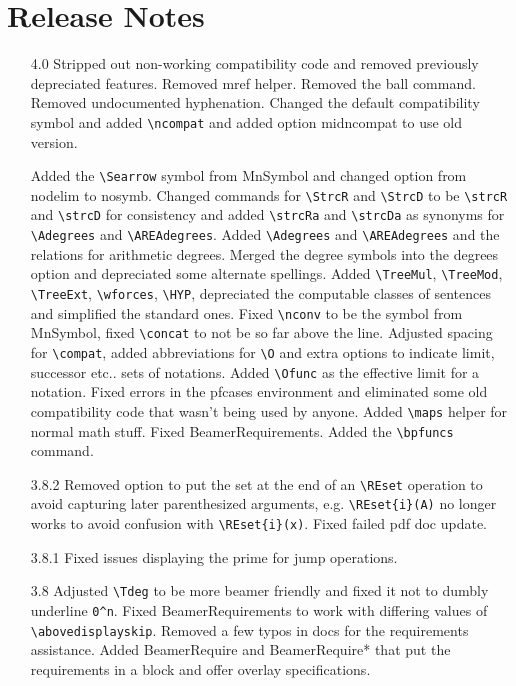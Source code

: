 \documentclass[leqno,11pt]{amsart}
\begin{document}
\section{Release Notes}


\begin{itemize}
	\item[4.0] Stripped out non-working compatibility code and removed previously depreciated features.  Removed mref helper.  Removed the ball command.  Removed undocumented hyphenation.   Changed the default compatibility symbol and added \verb=\ncompat= and added option midncompat to use old version.  

	Added the \verb=\Searrow= symbol from MnSymbol and changed option from nodelim to nosymb.
	Changed commands for \verb=\StrcR= and \verb=\StrcD= to be \verb=\strcR= and \verb=\strcD= for consistency and added \verb=\strcRa= and \verb=\strcDa= as synonyms for \verb=\Adegrees= and \verb=\AREAdegrees=.  Added \verb=\Adegrees= and \verb=\AREAdegrees= and the relations for arithmetic degrees.  Merged the degree symbols into the degrees option and depreciated some alternate spellings.  Added \verb=\TreeMul=, \verb=\TreeMod=, \verb=\TreeExt=, \verb=\wforces=, \verb=\HYP=, depreciated the computable classes of sentences and simplified the standard ones.  Fixed \verb=\nconv= to be the symbol from MnSymbol, fixed \verb=\concat= to not be so far above the line.  Adjusted spacing for \verb=\compat=, added abbreviations for \verb=\O= and extra options to indicate limit, successor etc.. sets of notations.  Added \verb=\Ofunc= as the effective limit for a notation.  Fixed errors in the pfcases environment and eliminated some old compatibility code that wasn't being used by anyone.  Added \verb=\maps= helper for normal math stuff.  Fixed BeamerRequirements.  Added the \verb=\bpfuncs= command.
	\item[3.8.2] Removed option to put the set at the end of an \verb=\REset= operation to avoid capturing later parenthesized arguments, e.g. \verb=\REset{i}(A)= no longer works to avoid confusion with \verb=\REset{i}(x)=.  Fixed failed pdf doc update.
	\item[3.8.1] Fixed issues displaying the prime for jump operations.
	\item[3.8] Adjusted \verb=\Tdeg= to be more beamer friendly and fixed it not to dumbly underline \verb=0^n=.  Fixed BeamerRequirements to work with differing values of \verb=\abovedisplayskip=.  Removed a few typos in docs for the requirements assistance.  Added BeamerRequire and BeamerRequire* that put the requirements in a block and offer overlay specifications.

\end{itemize}
\end{document}
